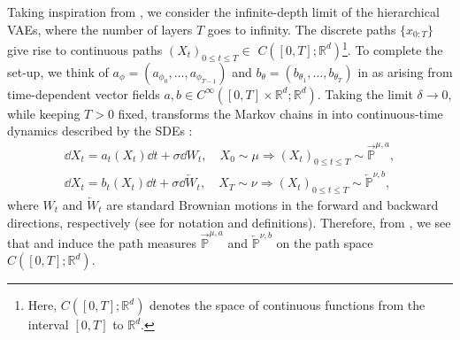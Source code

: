 Taking inspiration from \textcite{tzen2019neural, li2020scalable, huang2021variational}, we consider the infinite-depth limit of the hierarchical VAEs, where the number of layers $T$ goes to infinity. The discrete paths $\{x_{0:T}\}$ give rise to continuous paths $\left(X_t\right)_{0 \leq t \leq T} \in$ $C\left([0, T] ; \mathbb{R}^d\right)$\footnote{Here, $C\left([0, T] ; \mathbb{R}^d\right)$ denotes the space of continuous functions from the interval $[0, T]$ to $\mathbb{R}^d$.}. To complete the set-up, we think of $a_{\phi} = (a_{\phi_0}, \ldots, a_{\phi_{T-1}})$ and $b_{\theta} = (b_{\theta_1}, \ldots, b_{\theta_T})$ in  as arising from time-dependent vector fields $a, b \in C^{\infty}\left([0, T] \times \mathbb{R}^d ; \mathbb{R}^d\right)$. Taking the limit $\delta \rightarrow 0$, while keeping $T>0$ fixed, transforms the Markov chains in  into continuous-time dynamics described by the SDEs \parencite{tzen2019neural}:
\begin{subequations}
\begin{align}
 \dd X_t = a_t(X_t) \dd t + \sigma \dd W_t, \quad X_0 \sim \mu \Longrightarrow (X_t)_{0 \leq t \leq T} \sim \overrightarrow{\mathbb{P}}^{\mu, a}, \label{eq:forward_diffusion_process} \\
 \dd X_t = b_t(X_t) \dd t + \sigma \dd \overleftarrow{W}_t, \quad X_T \sim \nu \Longrightarrow (X_t)_{0 \leq t \leq T} \sim \overleftarrow{\mathbb{P}}^{\nu, b}, \label{eq:backward_diffusion_process}
\end{align}
\end{subequations}
where $W_t$ and $\overleftarrow{W}_t$ are standard Brownian motions in the forward and backward directions, respectively (see  for notation and definitions). Therefore, from , we see that  and  induce the path measures $\overrightarrow{\mathbb{P}}^{\mu, a}$ and $\overleftarrow{\mathbb{P}}^{\nu, b}$ on the path space $C\left([0, T] ; \mathbb{R}^d\right)$. 
